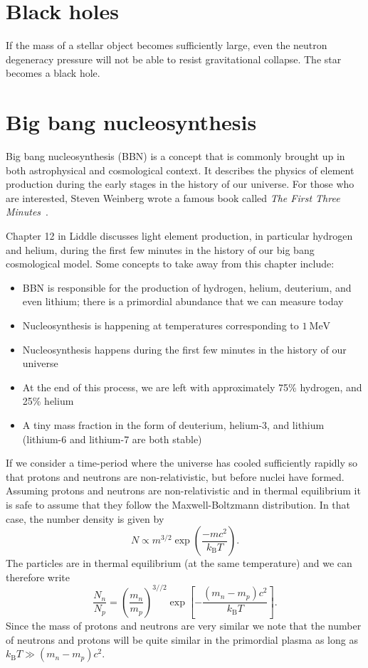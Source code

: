 \documentclass[a4paper,12pt]{article}
\theoremstyle{remark}
\newcommand{\mrm}[1]{\mathrm{#1}}
\renewcommand{\=}[1]{\stackrel{#1}{=}} %
\theoremstyle{plain}
\theoremstyle{definition}
\begin{document}
\section{Black holes}
If the mass of a stellar object becomes sufficiently large, even the neutron degeneracy pressure will not be able to resist gravitational collapse. The star becomes a black hole. 

\section{Big bang nucleosynthesis}
Big bang nucleosynthesis (BBN) is a concept that is commonly brought up in both astrophysical and cosmological context. It describes the physics of element production during the early stages in the history of our universe. For those who are interested, Steven Weinberg wrote a famous book called \textit{The First Three Minutes}~\cite{Weinberg1993}.

Chapter 12 in Liddle discusses light element production, in particular hydrogen and helium, during the first few minutes in the history of our big bang cosmological model. Some concepts to take away from this chapter include:
\begin{itemize}
\item BBN is responsible for the production of hydrogen, helium, deuterium, and even lithium; there is a primordial abundance that we can measure today
\item Nucleosynthesis is happening at temperatures corresponding to $1 \:\mrm{MeV}$
\item Nucleosynthesis happens during the first few minutes in the history of our universe
\item At the end of this process, we are left with approximately 75\% hydrogen, and 25\% helium
\item A tiny mass fraction in the form of deuterium, helium-3, and lithium (lithium-6 and lithium-7 are both stable)
\end{itemize}

If we consider a time-period where the universe has cooled sufficiently rapidly so that protons and neutrons are non-relativistic, but before nuclei have formed. Assuming protons and neutrons are non-relativistic and in thermal equilibrium it is safe to assume that they follow the Maxwell-Boltzmann distribution. In that case, the number density is given by
\begin{equation}
N \propto m^{3/2} \exp \left( \frac{-mc^2}{k_\mrm{B} T} \right).
\end{equation}
The particles are in thermal equilibrium (at the same temperature) and we can therefore write
\begin{equation}
\frac{N_n}{N_p} = \left( \frac{m_n}{m_p} \right) ^{3//2} \exp \left[ -\frac{(m_n - m_p)c^2}{k_\mrm{B} T} \right].
\end{equation}
Since the mass of protons and neutrons are very similar we note that the number of neutrons and protons will be quite similar in the primordial plasma as long as $k_\mrm{B} T \gg (m_n - m_p)c^2$.
\end{document}
